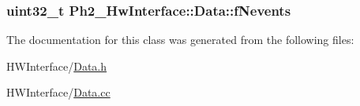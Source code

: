 \hypertarget{class_ph2___hw_interface_1_1_data_ac27abb30ceb327ce0fc4245caaf0b3d5}{
\subsubsection[{f\-Nevents}]{\setlength{\rightskip}{0pt plus 5cm}uint32\-\_\-t Ph2\-\_\-\-Hw\-Interface\-::\-Data\-::f\-Nevents\hspace{0.3cm}{\ttfamily [private]}}}\label{class_ph2___hw_interface_1_1_data_ac27abb30ceb327ce0fc4245caaf0b3d5}


The documentation for this class was generated from the following files\-:\begin{DoxyCompactItemize}
\item 
H\-W\-Interface/\hyperlink{_data_8h}{Data.\-h}\item 
H\-W\-Interface/\hyperlink{_data_8cc}{Data.\-cc}\end{DoxyCompactItemize}
